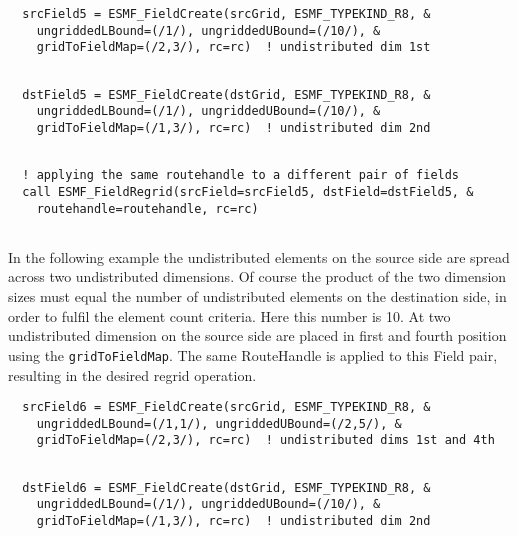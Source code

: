  \begin{verbatim}
  srcField5 = ESMF_FieldCreate(srcGrid, ESMF_TYPEKIND_R8, &
    ungriddedLBound=(/1/), ungriddedUBound=(/10/), &
    gridToFieldMap=(/2,3/), rc=rc)  ! undistributed dim 1st 
 
\end{verbatim}
 

 \begin{verbatim}
  dstField5 = ESMF_FieldCreate(dstGrid, ESMF_TYPEKIND_R8, &
    ungriddedLBound=(/1/), ungriddedUBound=(/10/), &
    gridToFieldMap=(/1,3/), rc=rc)  ! undistributed dim 2nd
 
\end{verbatim}
 

 \begin{verbatim}
  ! applying the same routehandle to a different pair of fields
  call ESMF_FieldRegrid(srcField=srcField5, dstField=dstField5, &
    routehandle=routehandle, rc=rc)
 
\end{verbatim}
 

   In the following example the undistributed elements on the source side are
   spread across two undistributed dimensions. Of course the product of the two
   dimension sizes must equal the number of undistributed elements on the 
   destination side, in order to fulfil the element count criteria. Here this 
   number is 10. At two undistributed dimension on the source side are placed
   in first and fourth position using the {\tt gridToFieldMap}. The same
   RouteHandle is applied to this Field pair, resulting in the desired 
   regrid operation. 

 \begin{verbatim}
  srcField6 = ESMF_FieldCreate(srcGrid, ESMF_TYPEKIND_R8, &
    ungriddedLBound=(/1,1/), ungriddedUBound=(/2,5/), &
    gridToFieldMap=(/2,3/), rc=rc)  ! undistributed dims 1st and 4th
 
\end{verbatim}
 

 \begin{verbatim}
  dstField6 = ESMF_FieldCreate(dstGrid, ESMF_TYPEKIND_R8, &
    ungriddedLBound=(/1/), ungriddedUBound=(/10/), &
    gridToFieldMap=(/1,3/), rc=rc)  ! undistributed dim 2nd
 
\end{verbatim}
 
